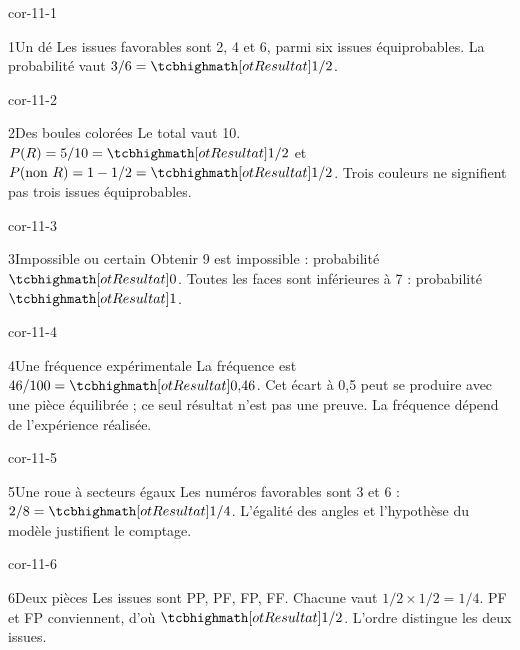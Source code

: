 \clearpage\pagestyle{otMain}\fontsize{11}{15}\selectfont{}
\begin{blocLivre}{cor-11-1}\begin{corrige}{1}{Un dé}
Les issues favorables sont 2, 4 et 6, parmi six issues équiprobables. La probabilité vaut $3/6=\res{1/2}$.
\end{corrige}\end{blocLivre}
\begin{blocLivre}{cor-11-2}\begin{corrige}{2}{Des boules colorées}
Le total vaut 10. $P(R)=5/10=\res{1/2}$ et $P(\text{non }R)=1-1/2=\res{1/2}$. Trois couleurs ne signifient pas trois issues équiprobables.
\end{corrige}\end{blocLivre}
\begin{blocLivre}{cor-11-3}\begin{corrige}{3}{Impossible ou certain}
Obtenir 9 est impossible : probabilité $\res0$. Toutes les faces sont inférieures à 7 : probabilité $\res1$.
\end{corrige}\end{blocLivre}
\begin{blocLivre}{cor-11-4}\begin{corrige}{4}{Une fréquence expérimentale}
La fréquence est $46/100=\res{0{,}46}$. Cet écart à 0,5 peut se produire avec une pièce équilibrée ; ce seul résultat n’est pas une preuve. La fréquence dépend de l’expérience réalisée.
\end{corrige}\end{blocLivre}
\begin{blocLivre}{cor-11-5}\begin{corrige}{5}{Une roue à secteurs égaux}
Les numéros favorables sont 3 et 6 : $2/8=\res{1/4}$. L’égalité des angles et l’hypothèse du modèle justifient le comptage.
\end{corrige}\end{blocLivre}
\begin{blocLivre}{cor-11-6}\begin{corrige}{6}{Deux pièces}
Les issues sont PP, PF, FP, FF. Chacune vaut $1/2\times1/2=1/4$. PF et FP conviennent, d’où $\res{1/2}$. L’ordre distingue les deux issues.
\label{fig-cor-11-6}
\end{corrige}\end{blocLivre}
